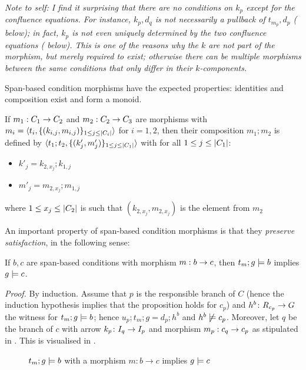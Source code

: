 \medskip\noindent
\emph{Note to self: I find it surprising that there are no conditions on $k_p$ except for the confluence equations. For instance, $k_p,d_q$ is \emph{not} necessarily a pullback of $t_{m_p},d_p$ ( below); in fact, $k_p$ is \emph{not even} uniquely determined by the two confluence equations ( below). This is one of the reasons why the $k$ are not part of the morphism, but merely required to exist; otherwise there can be multiple morphisms between the same conditions that only differ in their $k$-components.}

\medskip\noindent Span-based condition morphisms have the expected properties: identities and composition exist and form a monoid.

\begin{definition}
\end{definition}

\begin{definition}
  If $m_1:C_1\rightarrow C_2$ and $m_2:C_2\rightarrow C_3$ are morphisms with $m_i=\langle{t_i,\{{(k_{i,j},m_{i,j})}\}_{1\leq j\leq |{C_i}|}}\rangle$ for $i=1,2$, then their composition $m_1;m_2$ is defined by $\langle{t_1;t_2,\{{(k'_j,m'_j)}\}_{1\leq j\leq |{C_1}|}}\rangle$ with for all $1\leq j\leq |{C_1}|$:
  \begin{itemize}
  \item $k'_j=k_{2,x_j};k_{1,j}$
  \item $m'_j=m_{2,x_j};m_{1,j}$
  \end{itemize}
  where $1\leq x_j\leq |{C_2}|$ is such that $(k_{2,x_j},m_{2,x_j})$ is the element from $m_2$ 
\end{definition}

\begin{proposition}
\end{proposition}

\medskip\noindent An important property of span-based condition morphisms is that they \emph{preserve satisfaction}, in the following sense:
%
\begin{proposition}
If $b,c$ are span-based conditions with morphism $m:b\rightarrow c$, then $t_m;g\models b$ implies $g\models c$.
\end{proposition}
%
\emph{Proof.} By induction. Assume that $p$ is the responsible branch of $C$ (hence the induction hypothesis implies that the proposition holds for $c_p$) and $h^b\colon R_{c_p}\rightarrow G$ the witness for $t_m;g\models b$; hence $u_p;t_m;g=d_p;h^b$ and $h^b\not\models c_p$. Moreover, let $q$ be the branch of $c$ with arrow $k_p\colon I_q\rightarrow I_p$ and morphism $m_p:c_q\rightarrow c_p$ as stipulated in . This is visualised in .
%
\begin{figure}
  \centering
  
  \caption{$t_m;g\models b$ with a morphism $m:b\rightarrow c$ implies $g\models c$}
\end{figure}

